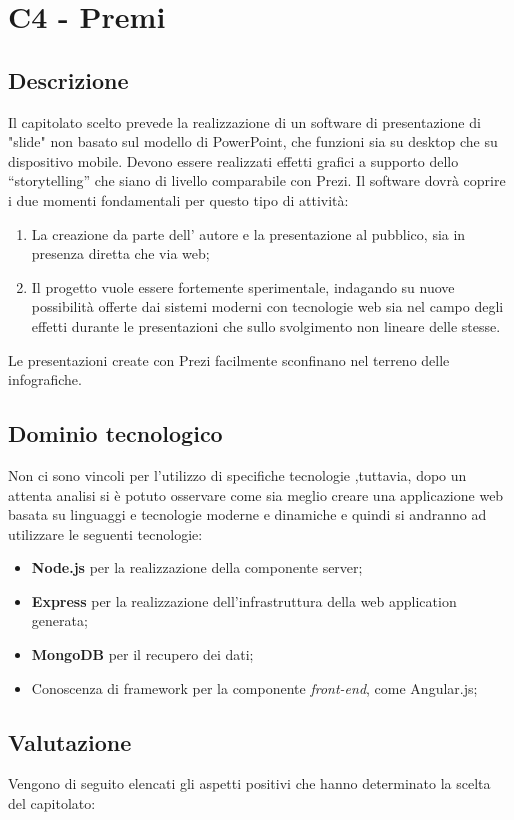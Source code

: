\section{C4 - Premi}{
 \subsection{Descrizione}
   Il capitolato scelto prevede la realizzazione di un software di presentazione di "slide" non basato sul modello di PowerPoint, che funzioni sia su desktop che su dispositivo mobile. Devono essere realizzati effetti grafici a supporto dello  “storytelling” che siano di livello comparabile con Prezi.
   Il software dovrà coprire i due momenti fondamentali per questo tipo di attività:
   \begin{enumerate}
   		\item La creazione da parte dell' autore e la presentazione al pubblico, sia in presenza diretta che via web;
   		\item Il progetto vuole essere fortemente sperimentale, indagando su nuove possibilità  offerte dai sistemi moderni con tecnologie web sia nel campo degli effetti durante le presentazioni che sullo svolgimento non lineare delle stesse.
   \end{enumerate}
   Le presentazioni create con Prezi facilmente sconfinano nel terreno delle infografiche.

\subsection{Dominio tecnologico}
Non ci sono vincoli per l'utilizzo di specifiche tecnologie ,tuttavia, dopo un attenta analisi si è potuto osservare come sia meglio creare una applicazione web basata su linguaggi e tecnologie moderne e dinamiche e quindi si andranno ad utilizzare le seguenti tecnologie:
\begin{itemize}
\item \textbf{Node.js}  per la realizzazione della componente server;
\item \textbf{Express}  per la realizzazione dell'infrastruttura della web application generata;
\item \textbf{MongoDB}  per il recupero dei dati;
\item Conoscenza di framework per la componente \emph{front-end}, come Angular.js;

\end{itemize}
\subsection{Valutazione}
Vengono di seguito elencati gli aspetti positivi che hanno determinato la scelta del capitolato:

}
